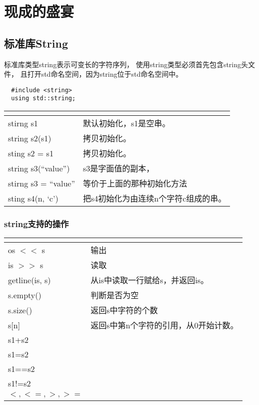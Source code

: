 \chapter{现成的盛宴}
\section{标准库String}
标准库类型string表示可变长的字符序列，%
使用string类型必须首先包含string头文件，%
且打开std命名空间，因为string位于std命名空间中。%
\begin{lstlisting}
  #include <string>
  using std::string;
\end{lstlisting}
\begin{table}[htpb]
  \centering
  \begin{tabular}{|l|l|}\hline
    \multicolumn{2}{|c|}{{\color{red}{初始化string对象的方式}}} \\\hline 
    stirng s1 & 默认初始化，s1是空串。  \\\hline 
    string s2(s1) & 拷贝初始化。 \\\hline 
    sting s2 = s1 & 拷贝初始化。 \\\hline 
    string s3(\textquotedblleft{value}\textquotedblright{})&s3是字面值的副本，{\color{red}{除了字面值最后的那个空字符串。}} \\\hline
    stirng s3 = \textquotedblleft{value}\textquotedblright & 等价于上面的那种初始化方法 \\\hline
    sting s4(n, \textquoteleft{c}\textquoteright{}) & 把s4初始化为由连续n个字符c组成的串。\\\hline
  \end{tabular}    
\end{table}

\subsection{string支持的操作}
\begin{table}[htpb]
  \centering
  \begin{tabular}{|l|l|}\hline
    \multicolumn{2}{|c|}{{\color{red}{string支持的操作}}} \\\hline
    os $<<$ s & 输出 \\\hline
    is $>>$ s & 读取 \\\hline
    getline(is, s) & 从is中读取一行赋给s，并返回is。\\\hline
    s.empty() & 判断是否为空 \\\hline
    s.size() & 返回s中字符的个数 \\\hline
    s[n] & 返回s中第n个字符的引用，从0开始计数。\\\hline
    s1+s2 & \\\hline
    s1=s2 & \\\hline
    s1==s2 & \\\hline
    s1!=s2 & \\\hline
    $<, <=, >, >=$ & \\\hline
  \end{tabular}
\end{table}
